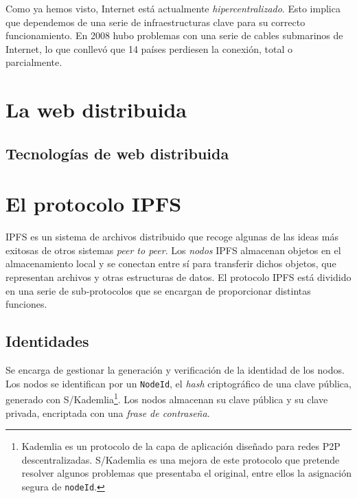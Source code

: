 \documentclass[12pt]{article} %
\begin{document}
Como ya hemos visto, Internet está actualmente \textit{hipercentralizado}. Esto implica que dependemos de una serie de infraestructuras clave para su correcto funcionamiento. En 2008 hubo problemas con una serie de cables submarinos de Internet, lo que conllevó que 14 países perdiesen la conexión, total o parcialmente\cite{2008-cable-disruption}.



\section{La web distribuida} %
\label{sec:la_web_distribuida}

\subsection{Tecnologías de web distribuida} %
\label{sub:tecnologías_de_web_distribuida}



\section{El protocolo IPFS} %
\label{sec:el_protocolo_ipfs}

IPFS es un sistema de archivos distribuido que recoge algunas de las ideas más exitosas de otros sistemas \textit{peer to peer}. Los \textit{nodos} IPFS almacenan objetos en el almacenamiento local y se conectan entre sí para transferir dichos objetos, que representan archivos y otras estructuras de datos. El protocolo IPFS está dividido en una serie de sub-protocolos que se encargan de proporcionar distintas funciones.

\subsection{Identidades} %
\label{sub:identidades}

Se encarga de gestionar la generación y verificación de la identidad de los nodos. Los nodos se identifican por un \texttt{NodeId}, el \textit{hash} criptográfico de una clave pública, generado con S/Kademlia\footnote{Kademlia es un protocolo de la capa de aplicación diseñado para redes P2P descentralizadas. S/Kademlia es una mejora de este protocolo que pretende resolver algunos problemas que presentaba el original, entre ellos la asignación segura de \texttt{nodeId}.\cite{S/Kamdelia}}. Los nodos almacenan su clave pública y su clave privada, encriptada con una \textit{frase de contraseña}.
\end{document}
